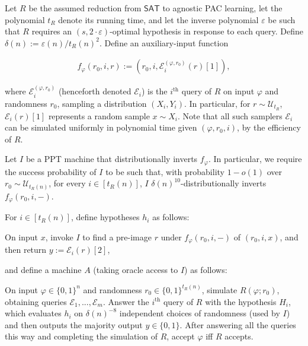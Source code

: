 Let $R$ be the assumed reduction from ${\mathsf{SAT}}$ to agnostic PAC learning, let the polynomial $t_{R}$ denote its running time, and let the inverse polynomial $\varepsilon$ be such that $R$ requires an $(s,2\cdot\varepsilon)$-optimal hypothesis in response to each query. Define $\delta(n):=\varepsilon(n)/t_{R}(n)^{2}$. Define an auxiliary-input function\par


\[\begin{gathered}
f_{\varphi}(r_{0},i,r):=(r_{0},i,\mathcal{E}_{i}^{(\varphi,r_{0})}(r)[1]),
\end{gathered}\]


where $\mathcal{E}_{i}^{(\varphi,r_{0})}$ (henceforth denoted $\mathcal{E}_{i}$) is the $i^{\text{th}}$ query of $R$ on input $\varphi$ and randomness $r_{0}$, sampling a distribution $(X_{i},Y_{i})$. In particular, for $r\sim\mathcal{U}_{t_{R}}$, $\mathcal{E}_{i}(r)[1]$ represents a random sample $x\sim X_{i}$. Note that all such samplers $\mathcal{E}_{i}$ can be simulated uniformly in polynomial time given $(\varphi,r_{0},i)$, by the efficiency of $R$.\par




Let $I$ be a PPT machine that distributionally inverts $f_{\varphi}$. In particular, we require the success probability of $I$ to be such that, with probability $1-o(1)$ over $r_{0}\sim\mathcal{U}_{t_{R}(n)}$, for every $i\in[t_{R}(n)]$, $I$ $\delta(n)^{10}$-distributionally inverts $f_{\varphi}(r_{0},i,-)$.\par




For $i\in[t_{R}(n)]$, define hypotheses $h_{i}$ as follows:\par



On input $x$, invoke $I$ to find a pre-image $r$ under $f_{\varphi}(r_{0},i,-)$ of $(r_{0},i,x)$, and then return $y:=\mathcal{E}_{i}(r)[2]$,\par



and define a machine $A$ (taking oracle access to $I$) as follows:\par



On input $\varphi\in\{0,1\}^{n}$ and randomness $r_{0}\in\{0,1\}^{t_{R}(n)}$, simulate $R(\varphi;r_{0})$, obtaining queries $\mathcal{E}_{1},...,\mathcal{E}_{m}$. Answer the $i^{\text{th}}$ query of $R$ with the hypothesis $H_{i}$, which evaluates $h_{i}$ on $\delta(n)^{-8}$ independent choices of randomness (used by $I$) and then outputs the majority output $y\in\{0,1\}$. After answering all the queries this way and completing the simulation of $R$, accept $\varphi$ iff $R$ accepts.\par




